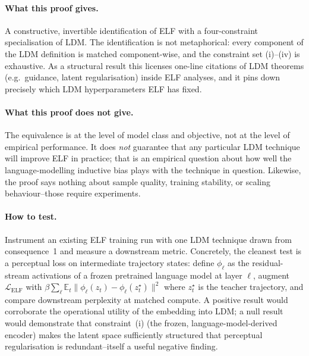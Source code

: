\documentclass[11pt]{article}
\begin{document}
\paragraph{What this proof gives.}
A constructive, invertible identification of ELF with a four-constraint
specialisation of LDM. The identification is not metaphorical: every
component of the LDM definition is matched component-wise, and the
constraint set (i)--(iv) is exhaustive. As a structural result this
licenses one-line citations of LDM theorems (e.g.\ guidance, latent
regularisation) inside ELF analyses, and it pins down precisely which
LDM hyperparameters ELF has fixed.

\paragraph{What this proof does not give.}
The equivalence is at the level of model class and objective, not at the
level of empirical performance. It does \emph{not} guarantee that any
particular LDM technique will improve ELF in practice; that is an
empirical question about how well the language-modelling inductive bias
plays with the technique in question. Likewise, the proof says nothing
about sample quality, training stability, or scaling behaviour--those
require experiments.

\paragraph{How to test.}
Instrument an existing ELF training run with one LDM technique drawn from
consequence~1 and measure a downstream metric. Concretely, the cleanest
test is a perceptual loss on intermediate trajectory states: define
$\phi_{\ell}$ as the residual-stream activations of a frozen pretrained
language model at layer $\ell$, augment $\mathcal{L}_{\mathrm{ELF}}$ with
$\beta\sum_{\ell}\mathbb{E}_{t}\|\phi_{\ell}(z_{t})-\phi_{\ell}(z_{t}^{\star})\|^{2}$
where $z_{t}^{\star}$ is the teacher trajectory, and compare downstream
perplexity at matched compute. A positive result would corroborate the
operational utility of the embedding into LDM; a null result would
demonstrate that constraint~(i) (the frozen, language-model-derived
encoder) makes the latent space sufficiently structured that perceptual
regularisation is redundant--itself a useful negative finding.
\end{document}
